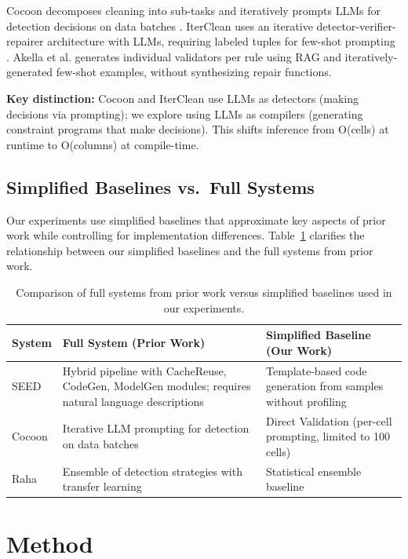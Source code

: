 \documentclass{article}
\begin{document}
Cocoon decomposes cleaning into sub-tasks and iteratively prompts LLMs for detection decisions on data batches \citep{huang2024cocoon}. IterClean uses an iterative detector-verifier-repairer architecture with LLMs, requiring labeled tuples for few-shot prompting \citep{ni2024iterclean}. Akella et al. \citep{akella2025quality} generates individual validators per rule using RAG and iteratively-generated few-shot examples, without synthesizing repair functions.

\textbf{Key distinction:} Cocoon and IterClean use LLMs as detectors (making decisions via prompting); we explore using LLMs as compilers (generating constraint programs that make decisions). This shifts inference from O(cells) at runtime to O(columns) at compile-time.

\subsection{Simplified Baselines vs.~Full Systems}

Our experiments use simplified baselines that approximate key aspects of prior work while controlling for implementation differences. Table~\ref{tab:baseline_comparison} clarifies the relationship between our simplified baselines and the full systems from prior work.

\begin{table}[h]
\caption{Comparison of full systems from prior work versus simplified baselines used in our experiments.}
\label{tab:baseline_comparison}
\centering
\small
\begin{tabular}{lp{4.5cm}p{4.5cm}}
\toprule
\textbf{System} & \textbf{Full System (Prior Work)} & \textbf{Simplified Baseline (Our Work)} \\
\midrule
SEED \citep{chen2024seed} & Hybrid pipeline with CacheReuse, CodeGen, ModelGen modules; requires natural language descriptions & Template-based code generation from samples without profiling \\
Cocoon \citep{huang2024cocoon} & Iterative LLM prompting for detection on data batches & Direct Validation (per-cell prompting, limited to 100 cells) \\
Raha \citep{mahdavi2019raha} & Ensemble of detection strategies with transfer learning & Statistical ensemble baseline \\
\bottomrule
\end{tabular}
\end{table}

\section{Method}
\label{sec:method}
\end{document}
